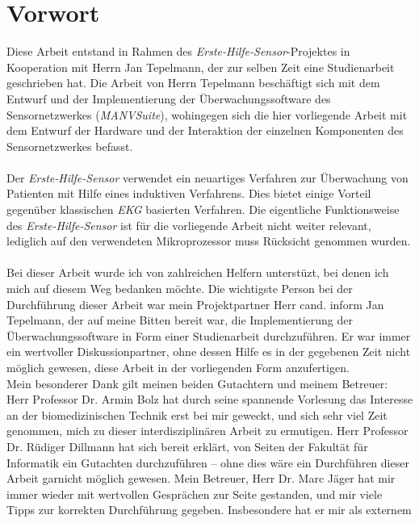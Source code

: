 \chapter*{Vorwort} 

Diese Arbeit entstand in Rahmen des \emph{Erste-Hilfe-Sensor}-Projektes in Kooperation mit Herrn Jan Tepelmann,
der zur selben Zeit eine Studienarbeit geschrieben hat\cite{Jan}. Die Arbeit von Herrn Tepelmann
beschäftigt sich mit dem Entwurf und der Implementierung der Überwachungssoftware des Sensornetzwerkes
(\emph{MANVSuite}), wohingegen sich die hier vorliegende Arbeit mit dem Entwurf der Hardware und der Interaktion der
einzelnen Komponenten des Sensornetzwerkes befasst.\\
\\
Der \emph{Erste-Hilfe-Sensor} verwendet ein neuartiges Verfahren zur Überwachung von Patienten mit Hilfe eines induktiven
Verfahrens. Dies bietet einige Vorteil gegenüber klassischen \emph{EKG} basierten Verfahren. Die eigentliche Funktionsweise
des \emph{Erste-Hilfe-Sensor} ist für die vorliegende Arbeit nicht weiter relevant, lediglich auf den verwendeten
Mikroprozessor muss Rücksicht genommen wurden.\\
\\
Bei dieser Arbeit wurde ich von zahlreichen Helfern unterstüzt, bei denen ich mich auf diesem Weg bedanken möchte. 
Die wichtigste Person bei der Durchführung dieser Arbeit war mein Projektpartner Herr cand. inform Jan Tepelmann, der 
auf meine Bitten bereit war, die Implementierung der Überwachungssoftware in Form einer Studienarbeit durchzuführen. Er
war immer ein wertvoller Diskussionpartner, ohne dessen Hilfe es in der gegebenen Zeit nicht möglich gewesen, 
diese Arbeit in der vorliegenden Form anzufertigen.\\
Mein besonderer Dank gilt meinen beiden Gutachtern und meinem Betreuer: Herr Professor Dr. Armin Bolz hat durch seine 
spannende Vorlesung das Interesse an der biomedizinischen Technik erst bei mir geweckt, und sich sehr viel Zeit 
genommen, mich zu dieser interdisziplinären Arbeit zu ermutigen. Herr Professor Dr. Rüdiger Dillmann hat sich bereit 
erklärt, von Seiten der Fakultät für Informatik ein Gutachten durchzuführen -- ohne dies wäre ein Durchführen 
dieser Arbeit garnicht möglich gewesen. Mein Betreuer, Herr Dr. Marc Jäger hat mir immer wieder mit wertvollen Gesprächen
zur Seite gestanden, und mir viele Tipps zur korrekten Durchführung gegeben. Insbesondere hat er mir als externem 
